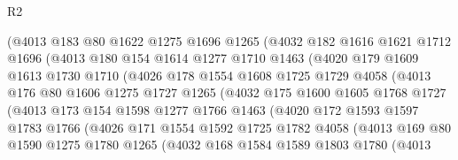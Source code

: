 \begin{lexlean}{R2}
\begin{coremodule}
              (@4013
                @183
                @80
                @1622
                @1275
                @1696
                @1265
                (@4032
                  @182
                  @1616
                  @1621
                  @1712
                  @1696
                  (@4013
                    @180
                    @154
                    @1614
                    @1277
                    @1710
                    @1463
                    (@4020
                      @179
                      @1609
                      @1613
                      @1730
                      @1710
                      (@4026
                        @178
                        @1554
                        @1608
                        @1725
                        @1729
                        @4058
                        (@4013
                          @176
                          @80
                          @1606
                          @1275
                          @1727
                          @1265
                          (@4032
                            @175
                            @1600
                            @1605
                            @1768
                            @1727
                            (@4013
                              @173
                              @154
                              @1598
                              @1277
                              @1766
                              @1463
                              (@4020
                                @172
                                @1593
                                @1597
                                @1783
                                @1766
                                (@4026
                                  @171
                                  @1554
                                  @1592
                                  @1725
                                  @1782
                                  @4058
                                  (@4013
                                    @169
                                    @80
                                    @1590
                                    @1275
                                    @1780
                                    @1265
                                    (@4032
                                      @168
                                      @1584
                                      @1589
                                      @1803
                                      @1780
                                      (@4013

\end{coremodule}
\end{lexlean}
